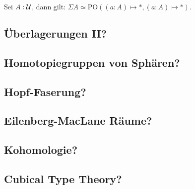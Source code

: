 \begin{bemerkung}
  Sei $A:\mathcal{U}$, dann gilt: $\Sigma A\simeq \mathrm{PO}((a:A)\mapsto \ast, (a:A)\mapsto \ast)$.
\end{bemerkung}
\subsection{Überlagerungen II?}
\subsection{Homotopiegruppen von Sphären?}
\subsection{Hopf-Faserung?}
\subsection{Eilenberg-MacLane Räume?}
\subsection{Kohomologie?}
\subsection{Cubical Type Theory?}

